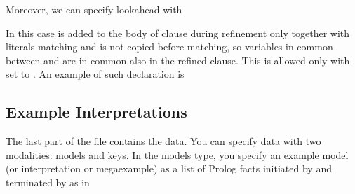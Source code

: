 \documentclass[letterpaper,10pt,english]{sphinxmanual}
\begin{document}
Moreover, we can specify lookahead with

\begin{sphinxVerbatim}[commandchars=\\\{\}]
  
\end{sphinxVerbatim}

In this case  is added to the body of clause during refinement only together with literals matching  and  is not copied before matching, so variables in common between  and  are in common also in the refined clause. This is allowed only with  set to .
An example of such declaration is

\begin{sphinxVerbatim}[commandchars=\\\{\}]
\PYG{p}{[}\PYG{p}{]}
\end{sphinxVerbatim}


\subsection{Example Interpretations}
\label{\detokenize{index:example-interpretations}}
The last part of the file contains the data.
You can specify data with two modalities: models and keys.
In the models type, you specify an example model (or interpretation or megaexample) as a list of Prolog facts initiated by  and terminated by  as in
\end{document}
